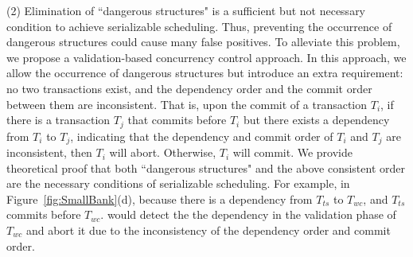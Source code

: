 (2) Elimination of ``dangerous structures" is a sufficient but not necessary condition to achieve serializable scheduling.
Thus, preventing the occurrence of dangerous structures could cause many false positives. %
To alleviate this problem, we propose a validation-based concurrency control approach.
In this approach, we allow the occurrence of dangerous structures but introduce an extra requirement: no two transactions exist, and the dependency order and the commit order between them are inconsistent.
That is, upon the commit of a transaction $T_i$, if there is a transaction $T_j$ that commits before $T_i$ but there exists a dependency from $T_i$ to $T_j$, indicating that the dependency and commit order of $T_i$ and $T_j$ are inconsistent, then $T_i$ will abort. Otherwise, $T_i$ will commit.
We provide theoretical proof that both ``dangerous structures" and the above consistent order are the necessary conditions of serializable scheduling.
For example, in Figure~\ref{fig:SmallBank}(d), because there is a dependency from $T_{ts}$ to $T_{wc}$, and $T_{ts}$ commits before $T_{wc}$. \sysname would detect the the dependency in the validation phase of $T_{wc}$ and abort it due to the inconsistency of the dependency order and commit order. 


